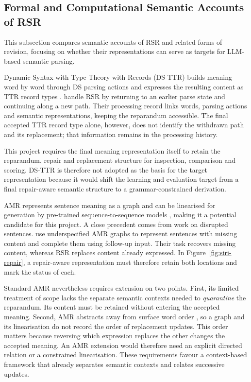 \subsection{Formal and Computational Semantic Accounts of RSR}
\label{sec:rw-representation-choice}

This subsection compares semantic accounts of RSR and related forms of
revision, focusing on whether their representations can serve as targets for
LLM-based semantic parsing.

Dynamic Syntax with Type Theory with Records (DS-TTR) builds meaning word by
word through DS parsing actions and expresses the resulting content as TTR
record types \citep{purverIncrementalSemanticConstruction2011}.
\citet{houghProcessingSelfrepairsIncremental2012} handle RSR by
returning to an earlier parse state and continuing along a new path.
Their processing record links words, parsing actions and semantic
representations, keeping the reparandum accessible. The final accepted TTR
record type alone, however, does not identify the withdrawn path and its
replacement; that information remains in the processing history.

This project requires the final meaning representation itself to retain the
reparandum, repair and replacement structure for inspection, comparison and
scoring. DS-TTR is therefore not adopted as the basis for the target
representation because it would shift the learning and evaluation target from
a final repair-aware semantic structure to a grammar-constrained derivation.

AMR represents sentence meaning as a graph
\citep{banarescuAbstractMeaningRepresentation2013} and can be linearised for
generation by pre-trained sequence-to-sequence models
\citep{fanLeveragingAMRGraph2024}, making it a potential candidate for this project. A
close precedent comes from work on disrupted sentences.
\citet{addleseeUnderstandingDisruptedSentences2023} use underspecified AMR
graphs to represent sentences with missing content and complete them using
follow-up input. Their task recovers missing content, whereas RSR replaces
content already expressed. In Figure~\ref{fig:siri-repair}, a repair-aware
representation must therefore retain both locations and mark the status of
each.

Standard AMR nevertheless requires extension on two points. First, its
limited treatment of scope \citep{bosSquibExpressivePower2016} lacks the
separate semantic contexts needed to \emph{quarantine} the reparandum.
Its content must be retained without entering the accepted meaning. Second,
AMR abstracts away from surface word order
\citep{banarescuAbstractMeaningRepresentation2013}, so a graph and its
linearisation do not record the order of replacement updates. This order matters
because reversing which expression replaces the other changes the accepted
meaning. An AMR extension would therefore need an explicit directed relation
or a constrained linearisation. These requirements favour a context-based
framework that already separates semantic contexts and relates successive
updates.

